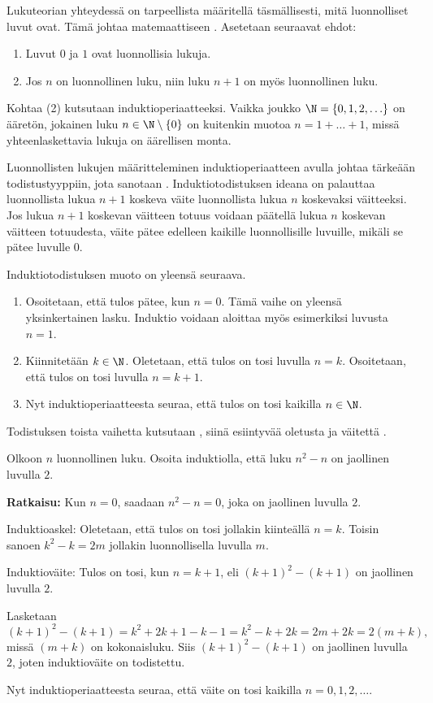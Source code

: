 Lukuteorian yhteydessä on tarpeellista määritellä täsmällisesti, mitä luonnolliset luvut ovat. Tämä johtaa matemaattiseen . Asetetaan seuraavat ehdot:
\begin{enumerate}
\item Luvut $0$ ja $1$ ovat luonnollisia lukuja.
\item Jos $n$ on luonnollinen luku, niin luku $n+1$ on myös luonnollinen luku.
\end{enumerate}
Kohtaa (2) kutsutaan induktioperiaatteeksi. Vaikka joukko
$\N = \{0, 1, 2, \ldots\}$
on ääretön, jokainen luku $n\in \N\setminus \{0\}$ on kuitenkin muotoa $n=1+\ldots + 1$, missä yhteenlaskettavia lukuja on äärellisen monta.

Luonnollisten lukujen määritteleminen induktioperiaatteen avulla johtaa tärkeään todistustyyppiin, jota sanotaan . Induktiotodistuksen ideana on palauttaa luonnollista lukua $n+1$ koskeva väite luonnollista lukua $n$ koskevaksi väitteeksi. Jos lukua $n+1$ koskevan väitteen totuus voidaan päätellä lukua $n$ koskevan väitteen totuudesta, väite pätee  edelleen kaikille luonnollisille luvuille, mikäli se pätee luvulle $0$. 

Induktiotodistuksen muoto on yleensä seuraava.
\begin{enumerate}
\item Osoitetaan, että tulos pätee, kun $n=0$. Tämä vaihe on yleensä yksinkertainen lasku. Induktio voidaan aloittaa myös esimerkiksi luvusta $n=1$.
\item Kiinnitetään $k\in \N$. Oletetaan, että tulos on tosi luvulla $n=k$. Osoitetaan, että tulos on tosi luvulla $n=k+1$.
\item Nyt induktioperiaatteesta seuraa, että tulos on tosi kaikilla $n\in \N$.
\end{enumerate}
Todistuksen toista vaihetta kutsutaan , siinä esiintyvää oletusta  ja väitettä .

\begin{esimerkki}
Olkoon $n$ luonnollinen luku. Osoita induktiolla, että luku $n^2-n$ on jaollinen luvulla $2$.

{\bf Ratkaisu:} 
Kun $n=0$, saadaan $n^2-n=0$, joka on jaollinen luvulla $2$.

Induktioaskel: Oletetaan, että tulos on tosi jollakin kiinteällä $n=k$. Toisin sanoen $k^2-k=2m$ jollakin luonnollisella luvulla $m$. 

Induktioväite: Tulos on tosi, kun $n=k+1$, eli $(k+1)^2-(k+1)$ on jaollinen luvulla $2$.

Lasketaan
\[
(k+1)^2-(k+1)= k^2+2k+1-k-1= k^2-k +2k=2m +2k =2(m+k),
\]
missä $(m+k)$ on kokonaisluku. Siis $(k+1)^2-(k+1)$ on jaollinen luvulla $2$, joten induktioväite on todistettu.

Nyt induktioperiaatteesta seuraa, että väite on tosi kaikilla $n=0, 1, 2, \ldots$.
\end{esimerkki}


